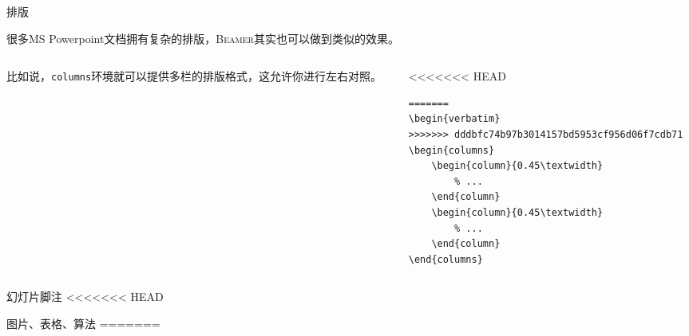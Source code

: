 \documentclass[aspectratio=169]{beamer}
\newcommand{\BibLaTeX}{\textsc{Bib}\LaTeX{}}
\newcommand{\Beamer}{\textsc{Beamer}}
\newcommand{\enableindent}{\setlength{\parskip}{6pt}\setlength{\parindent}{2em}}
\begin{document}
\begin{frame}[fragile]{排版}
	\enableindent

	很多MS Powerpoint文档拥有复杂的排版，\Beamer{}其实也可以做到类似的效果。
	\begin{columns}
		\begin{column}{0.45\textwidth}
			比如说，\texttt{columns}环境就可以提供多栏的排版格式，这允许你进行左右对照。
		\end{column}
		\begin{column}{0.45\textwidth}
<<<<<<< HEAD
			\begin{verbatim}
=======
\begin{verbatim}
>>>>>>> dddbfc74b97b3014157bd5953cf956d06f7cdb71
\begin{columns}
    \begin{column}{0.45\textwidth}
        % ...
    \end{column}
    \begin{column}{0.45\textwidth}
        % ...
    \end{column}
\end{columns}
\end{verbatim}
		\end{column}
	\end{columns}
\end{frame}

\begin{frame}[fragile]{幻灯片脚注}
<<<<<<< HEAD

\end{frame}

\begin{frame}{图片、表格、算法}
	\enableindent
=======

\end{frame}
\end{document}

